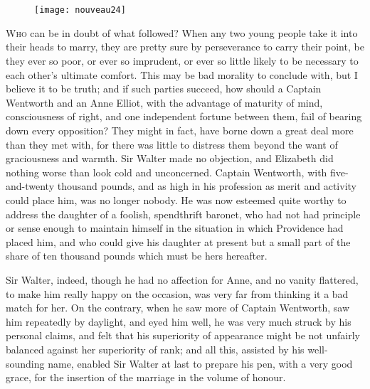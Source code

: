 \chapter[Chapter \thechapter]{}

\begin{figure}[t!]
\centering
\texttt{[image: nouveau24]}
\end{figure}

\lettrine[lines=4,lraise=0.3]{W}{ho} can be in doubt of what followed? When any two young people take it into their heads to marry, they are pretty sure by perseverance to carry their point, be they ever so poor, or ever so imprudent, or ever so little likely to be necessary to each other's ultimate comfort. This may be bad morality to conclude with, but I believe it to be truth; and if such parties succeed, how should a Captain Wentworth and an Anne Elliot, with the advantage of maturity of mind, consciousness of right, and one independent fortune between them, fail of bearing down every opposition? They might in fact, have borne down a great deal more than they met with, for there was little to distress them beyond the want of graciousness and warmth. Sir Walter made no objection, and Elizabeth did nothing worse than look cold and unconcerned. Captain Wentworth, with five-and-twenty thousand pounds, and as high in his profession as merit and activity could place him, was no longer nobody. He was now esteemed quite worthy to address the daughter of a foolish, spendthrift baronet, who had not had principle or sense enough to maintain himself in the situation in which Providence had placed him, and who could give his daughter at present but a small part of the share of ten thousand pounds which must be hers hereafter.

Sir Walter, indeed, though he had no affection for Anne, and no vanity flattered, to make him really happy on the occasion, was very far from thinking it a bad match for her. On the contrary, when he saw more of Captain Wentworth, saw him repeatedly by daylight, and eyed him well, he was very much struck by his personal claims, and felt that his superiority of appearance might be not unfairly balanced against her superiority of rank; and all this, assisted by his well-sounding name, enabled Sir Walter at last to prepare his pen, with a very good grace, for the insertion of the marriage in the volume of honour.

